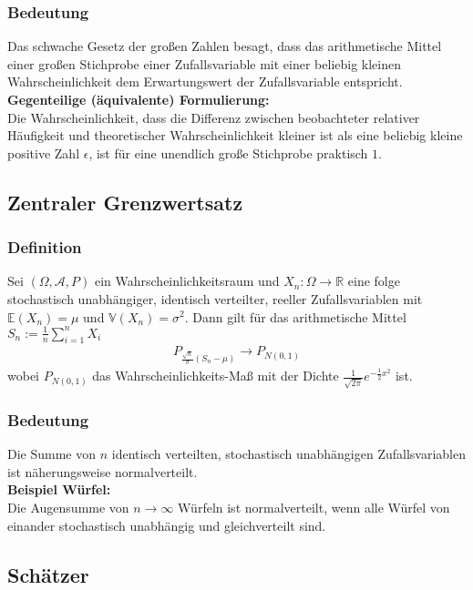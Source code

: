 \documentclass[a4paper]{article}
\begin{document}
\subsubsection{Bedeutung}
Das schwache Gesetz der großen Zahlen besagt, dass das arithmetische Mittel einer großen Stichprobe einer Zufallsvariable mit einer beliebig kleinen Wahrscheinlichkeit dem Erwartungswert der Zufallsvariable entspricht.\\

\textbf{Gegenteilige (äquivalente) Formulierung:}\\
Die Wahrscheinlichkeit, dass die Differenz zwischen beobachteter relativer Häufigkeit und theoretischer Wahrscheinlichkeit kleiner ist als eine beliebig kleine positive Zahl $\epsilon$, ist für eine unendlich große Stichprobe praktisch $1$.


\subsection{Zentraler Grenzwertsatz}

\subsubsection{Definition}
Sei $(\Omega, \mathcal{A}, P)$ ein Wahrscheinlichkeitsraum und $X_n :  \Omega \to \mathbb{R}$  eine folge stochastisch unabhängiger, identisch verteilter, reeller Zufallsvariablen mit $\mathbb{E}(X_n) = \mu$ und $\mathbb{V}(X_n)= \sigma^2$. Dann gilt für das arithmetische Mittel $S_n:= \frac{1}{n} \sum_{i=1}^n X_i$
\begin{align*}
P_{ \frac{\sqrt{n}}{\sigma} (S_n-\mu)} \to P_{N(0,1)}
\end{align*}
wobei $ P_{N(0,1)}$ das Wahrscheinlichkeits-Maß mit der Dichte $ \frac {1}{ \sqrt{2\pi}}e^{- \frac {1}{2} x^2}$ ist.
\subsubsection{Bedeutung}
Die Summe von $n$ identisch verteilten, stochastisch unabhängigen Zufallsvariablen ist näherungsweise normalverteilt.\\

\textbf{Beispiel Würfel:}\\
Die Augensumme von $n \to \infty$ Würfeln ist normalverteilt, wenn alle Würfel von einander stochastisch unabhängig und gleichverteilt sind.


\subsection{Schätzer}
\end{document}
